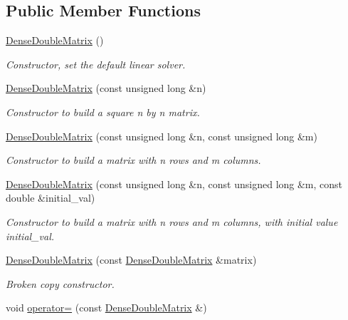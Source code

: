 \subsection*{Public Member Functions}
\begin{DoxyCompactItemize}
\item 
\hyperlink{classoomph_1_1DenseDoubleMatrix_a3f4448fda5506f6f8080228c3f8c7e06}{Dense\+Double\+Matrix} ()
\begin{DoxyCompactList}\small\item\em Constructor, set the default linear solver. \end{DoxyCompactList}\item 
\hyperlink{classoomph_1_1DenseDoubleMatrix_a50b8a6f60661c30b3875212f67c83a04}{Dense\+Double\+Matrix} (const unsigned long \&n)
\begin{DoxyCompactList}\small\item\em Constructor to build a square n by n matrix. \end{DoxyCompactList}\item 
\hyperlink{classoomph_1_1DenseDoubleMatrix_ab810633bd06c5d09b6b05d8173083e1e}{Dense\+Double\+Matrix} (const unsigned long \&n, const unsigned long \&m)
\begin{DoxyCompactList}\small\item\em Constructor to build a matrix with n rows and m columns. \end{DoxyCompactList}\item 
\hyperlink{classoomph_1_1DenseDoubleMatrix_a8b964715b2e8fa266d3676fc965296b0}{Dense\+Double\+Matrix} (const unsigned long \&n, const unsigned long \&m, const double \&initial\+\_\+val)
\begin{DoxyCompactList}\small\item\em Constructor to build a matrix with n rows and m columns, with initial value initial\+\_\+val. \end{DoxyCompactList}\item 
\hyperlink{classoomph_1_1DenseDoubleMatrix_a846bc6a2ec6b84d59591f3e9396b8493}{Dense\+Double\+Matrix} (const \hyperlink{classoomph_1_1DenseDoubleMatrix}{Dense\+Double\+Matrix} \&matrix)
\begin{DoxyCompactList}\small\item\em Broken copy constructor. \end{DoxyCompactList}\item 
void \hyperlink{classoomph_1_1DenseDoubleMatrix_a68af8c2bf36da97d198e20f3a9cb466d}{operator=} (const \hyperlink{classoomph_1_1DenseDoubleMatrix}{Dense\+Double\+Matrix} \&)

\end{DoxyCompactItemize}
